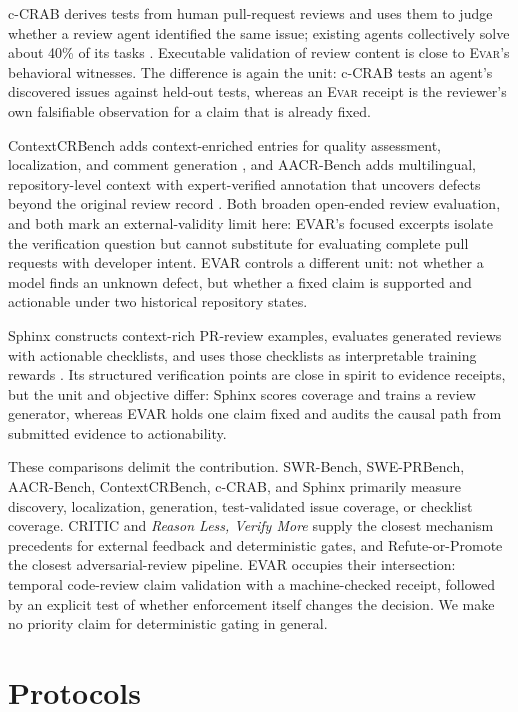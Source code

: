 \documentclass[acmsmall,screen,review,anonymous]{acmart}
\newcommand{\evar}{\textsc{Evar}\xspace}
\begin{document}
c-CRAB derives tests from human pull-request reviews and uses them to judge whether a review agent identified the same issue; existing agents collectively solve about 40\% of its tasks \cite{ccrab}. Executable validation of review content is close to \evar's behavioral witnesses. The difference is again the unit: c-CRAB tests an agent's discovered issues against held-out tests, whereas an \evar receipt is the reviewer's own falsifiable observation for a claim that is already fixed.

ContextCRBench adds context-enriched entries for quality assessment, localization, and comment generation \cite{contextcrbench}, and AACR-Bench adds multilingual, repository-level context with expert-verified annotation that uncovers defects beyond the original review record \cite{aacrbench}. Both broaden open-ended review evaluation, and both mark an external-validity limit here: EVAR's focused excerpts isolate the verification question but cannot substitute for evaluating complete pull requests with developer intent. EVAR controls a different unit: not whether a model finds an unknown defect, but whether a fixed claim is supported and actionable under two historical repository states.

Sphinx constructs context-rich PR-review examples, evaluates generated reviews with actionable checklists, and uses those checklists as interpretable training rewards \cite{sphinx}. Its structured verification points are close in spirit to evidence receipts, but the unit and objective differ: Sphinx scores coverage and trains a review generator, whereas EVAR holds one claim fixed and audits the causal path from submitted evidence to actionability.

These comparisons delimit the contribution. SWR-Bench, SWE-PRBench, AACR-Bench, ContextCRBench, c-CRAB, and Sphinx primarily measure discovery, localization, generation, test-validated issue coverage, or checklist coverage. CRITIC and \emph{Reason Less, Verify More} supply the closest mechanism precedents for external feedback and deterministic gates, and Refute-or-Promote the closest adversarial-review pipeline. EVAR occupies their intersection: temporal code-review claim validation with a machine-checked receipt, followed by an explicit test of whether enforcement itself changes the decision. We make no priority claim for deterministic gating in general.

\section{Protocols}
\end{document}
